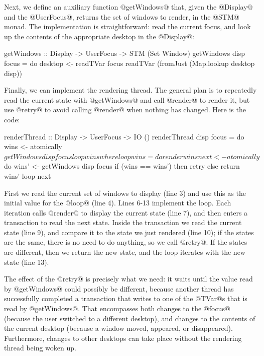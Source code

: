 Next, we define an auxiliary function @getWindows@ that, given the
@Display@ and the @UserFocus@, returns the set of windows to render,
in the @STM@ monad.  The implementation is straightforward: read the
current focus, and look up the contents of the appropriate desktop in
the @Display@:

\begin{haskell}
getWindows :: Display -> UserFocus -> STM (Set Window)
getWindows disp focus = do
  desktop <- readTVar focus
  readTVar (fromJust (Map.lookup desktop disp))
\end{haskell}

Finally, we can implement the rendering thread.  The general plan is
to repeatedly read the current state with @getWindows@ and call
@render@ to render it, but use @retry@ to avoid calling @render@ when
nothing has changed.  Here is the code:

\begin{numhaskell}
renderThread :: Display -> UserFocus -> IO ()
renderThread disp focus = do
  wins <- atomically $ getWindows disp focus
  loop wins
 where
  loop wins = do
    render wins
    next <- atomically $ do
               wins' <- getWindows disp focus
               if (wins == wins')
                   then retry
                   else return wins'
    loop next
\end{numhaskell}

\noindent First we read the current set of windows to display (line 3)
and use this as the initial value for the @loop@ (line 4).  Lines 6-13
implement the loop.  Each iteration calls @render@ to display the
current state (line 7), and then enters a transaction to read the next
state.  Inside the transaction we read the current state (line 9), and
compare it to the state we just rendered (line 10); if the states are
the same, there is no need to do anything, so we call @retry@.  If the
states are different, then we return the new state, and the loop
iterates with the new state (line 13).

The effect of the @retry@ is precisely what we need: it waits until
the value read by @getWindows@ could possibly be different, because
another thread has successfully completed a transaction that writes to
one of the @TVar@s that is read by @getWindows@.  That encompasses
both changes to the @focus@ (because the user switched to a different
desktop), and changes to the contents of the current desktop (because
a window moved, appeared, or disappeared).  Furthermore, changes to
other desktops can take place without the rendering thread being woken
up.

